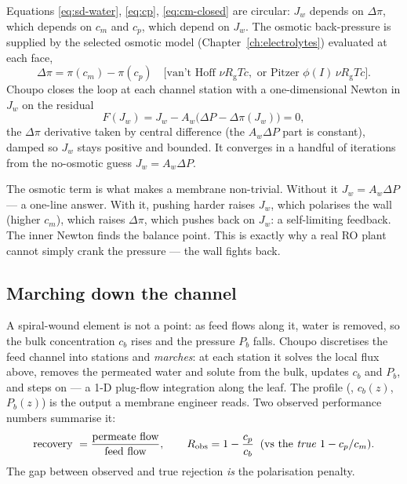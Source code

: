 \documentclass[11pt,a4paper]{article}
\newcommand{\Rgas}{R_{\!\mathrm{g}}}                %
\begin{document}
Equations \eqref{eq:sd-water}, \eqref{eq:cp}, \eqref{eq:cm-closed} are
circular: $J_w$ depends on $\Delta\pi$, which depends on $c_m$ and
$c_p$, which depend on $J_w$.  The osmotic back-pressure is supplied by
the selected osmotic model (Chapter~\ref{ch:electrolytes}) evaluated at
each face,
\begin{equation}
   \Delta\pi = \pi(c_m) - \pi(c_p)
   \quad\bigl[\text{van't Hoff } \nu \Rgas T c, \text{ or Pitzer } \phi(I)\,\nu \Rgas T c\bigr].
\end{equation}
Choupo closes the loop at each channel station with a one-dimensional
Newton in $J_w$ on the residual
\begin{equation}
   F(J_w) = J_w - A_w\bigl(\Delta P - \Delta\pi(J_w)\bigr) = 0,
\end{equation}
the $\Delta\pi$ derivative taken by central difference (the $A_w\Delta
P$ part is constant), damped so $J_w$ stays positive and bounded.  It
converges in a handful of iterations from the no-osmotic guess
$J_w = A_w\Delta P$.

\begin{intuition}
The osmotic term is what makes a membrane non-trivial.  Without it
$J_w = A_w\Delta P$ --- a one-line answer.  With it, pushing harder
raises $J_w$, which polarises the wall (higher $c_m$), which raises
$\Delta\pi$, which pushes back on $J_w$: a self-limiting feedback.  The
inner Newton finds the balance point.  This is exactly why a real RO
plant cannot simply crank the pressure --- the wall fights back.
\end{intuition}

\subsection{Marching down the channel}

A spiral-wound element is not a point: as feed flows along it, water is
removed, so the bulk concentration $c_b$ rises and the pressure
$P_b$ falls.  Choupo discretises the feed channel into stations and
\emph{marches}: at each station it solves the local flux above, removes
the permeated water and solute from the bulk, updates $c_b$ and $P_b$,
and steps on --- a 1-D plug-flow integration along the leaf.  The
profile (, $c_b(z)$, $P_b(z)$) is the output a membrane
engineer reads.  Two observed performance numbers summarise it:
\begin{equation}
   \text{recovery } = \frac{\text{permeate flow}}{\text{feed flow}},
   \qquad
   R_{\text{obs}} = 1 - \frac{c_p}{c_b}
   \;\;(\text{vs the \emph{true} } 1 - c_p/c_m).
\end{equation}
The gap between observed and true rejection \emph{is} the polarisation
penalty.
\end{document}
